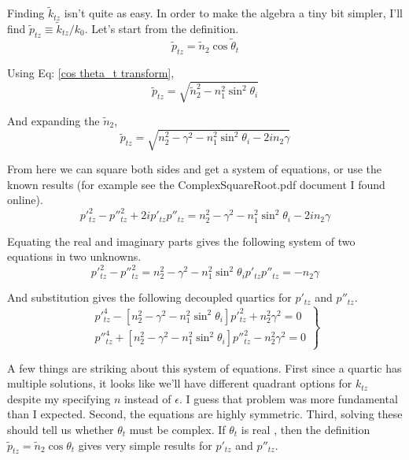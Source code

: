 \documentclass[10pt,a4paper]{article}
\begin{document}
Finding $\tilde{k}_{tz}$ isn't quite as easy.  In order to make the algebra a tiny bit simpler, I'll find $\tilde{p}_{tz} \equiv \tilde{k}_{tz}/k_0$. Let's start from the definition.
\begin{equation}
\tilde{p}_{tz}=\tilde{n}_2\cos\tilde{\theta}_t
\end{equation}

Using Eq: \ref{cos theta_t transform},
\begin{equation}
\tilde{p}_{tz}=\sqrt{\tilde{n}_2^2-n_1^2\sin^2\theta_i}
\end{equation}

And expanding the $\tilde{n}_2$,
\begin{equation}\label{p_tz-direct}
\tilde{p}_{tz}=\sqrt{n_2^2-\gamma^2-n_1^2\sin^2\theta_i-2in_2\gamma}
\end{equation}

From here we can square both sides and get a system of equations, or use the known results (for example see the ComplexSquareRoot.pdf document I found online).
\begin{equation}
p'^2_{tz}-p''^2_{tz}+2ip'_{tz}p''_{tz}=n_2^2-\gamma^2-n_1^2\sin^2\theta_i-2in_2\gamma
\end{equation}

Equating the real and imaginary parts gives the following system of two equations in two unknowns.
\begin{subequations}
\begin{equation}
p'^2_{tz}-p''^2_{tz}=n_2^2-\gamma^2-n_1^2\sin^2\theta_i
\end{equation}
\begin{equation}
p'_{tz}p''_{tz}=-n_2\gamma
\end{equation}
\end{subequations}

And substitution gives the following decoupled quartics for $p'_{tz}$ and $p''_{tz}$.
\begin{equation}\label{p_tz-system}
\left.
\begin{aligned}
p'^4_{tz}  - [n_2^2-\gamma^2-n_1^2\sin^2\theta_i]p'^2_{tz}  + n_2^2\gamma^2 = 0 \\
p''^4_{tz} + [n_2^2-\gamma^2-n_1^2\sin^2\theta_i]p''^2_{tz} - n_2^2\gamma^2 = 0
\end{aligned}
\right\}
\end{equation}

A few things are striking about this system of equations.
First since a quartic has multiple solutions, it looks like we'll have different quadrant options for $k_{tz}$ despite my specifying $n$ instead of $\epsilon$. I guess that problem was more fundamental than I expected.
Second, the equations are highly symmetric.
Third, solving these should tell us whether $\theta_t$ must be complex. If $\theta_t$ is real , then the definition $\tilde{p}_{tz}=\tilde{n}_2\cos\theta_t$ gives very simple results for $p'_{tz}$ and $p''_{tz}$.
\end{document}
